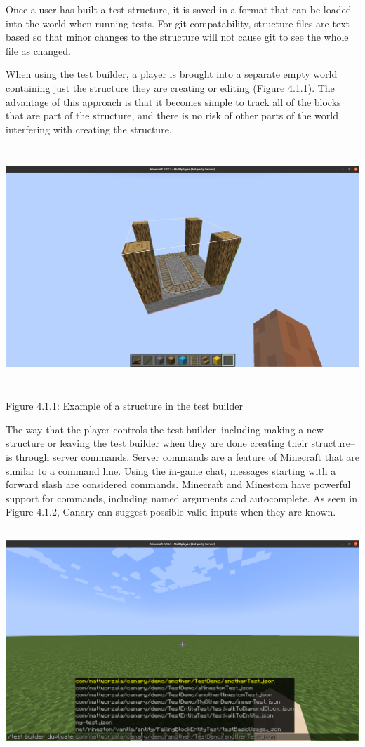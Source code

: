 \documentclass{article}
\begin{document}
\begin{onehalfspacing}
Once a user has built a test structure, it is saved in a format that can
be loaded into the world when running tests. For git compatability,
structure files are text-based so that minor changes to the structure
will not cause git to see the whole file as changed.

When using the test builder, a player is brought into a separate empty
world containing just the structure they are creating or editing (Figure
4.1.1). The advantage of this approach is that it becomes simple to
track all of the blocks that are part of the structure, and there is no
risk of other parts of the world interfering with creating the
structure.

\includegraphics[width=6.5in,height=3.56548in]{media/media/image9.png}

Figure 4.1.1: Example of a structure in the test builder

The way that the player controls the test builder--including making a
new structure or leaving the test builder when they are done creating
their structure--is through server commands. Server commands are a
feature of Minecraft that are similar to a command line. Using the
in-game chat, messages starting with a forward slash are considered
commands. Minecraft and Minestom have powerful support for commands,
including named arguments and autocomplete. As seen in Figure 4.1.2,
Canary can suggest possible valid inputs when they are known.

\includegraphics[width=6.0625in,height=3.32292in]{media/media/image13.png}


\end{onehalfspacing}
\end{document}
